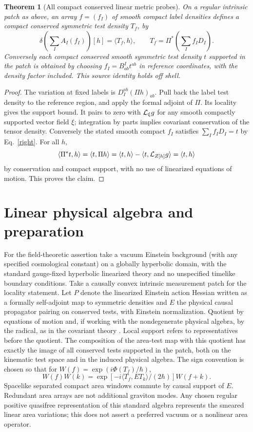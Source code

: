 \documentclass[11pt]{article}
\newtheorem{theorem}{Theorem}\newtheorem{proposition}[theorem]{Proposition}
\begin{document}
\begin{theorem}[All compact conserved linear metric probes]\label{Tlin}
On a regular intrinsic patch as above, an array \(f=(f_I)\) of smooth compact label densities defines a compact conserved symmetric test density \(T_f\), by
\[
 \delta\!\left(\sum_I A_I(f_I)\right)[h]=\langle T_f,h\rangle,\qquad
 T_f=\Pi^*\!\left(\sum_I f_I D_I\right).
\]
Conversely each compact conserved smooth symmetric test density \(t\) supported in the patch is obtained by choosing \(f_I=B^I_{ab}t^{ab}\) in reference coordinates, with the density factor included. This source identity holds off shell.
\end{theorem}
\begin{proof}
The variation at fixed labels is \(D_I^{ab}(\Pi h)_{ab}\). Pull back the label test density to the reference region, and apply the formal adjoint of \(\Pi\). Its locality gives the support bound. It pairs to zero with \(\mathcal L_\xi g\) for any smooth compactly supported vector field \(\xi\); integration by parts implies covariant conservation of the tensor density. Conversely the stated smooth compact \(f_I\) satisfies \(\sum_I f_ID_I=t\) by Eq.~\eqref{right}. For all \(h\),
\[
 \langle \Pi^*t,h\rangle=\langle t,\Pi h\rangle
                        =\langle t,h\rangle-\langle t,\mathcal L_{Z[h]}g\rangle
                        =\langle t,h\rangle
\]
by conservation and compact support, with no use of linearized equations of motion. This proves the claim.
\end{proof}

\section{Linear physical algebra and preparation}
For the field-theoretic assertion take a vacuum Einstein background (with any specified cosmological constant) on a globally hyperbolic domain, with the standard gauge-fixed hyperbolic linearized theory and no unspecified timelike boundary conditions. Take a causally convex intrinsic measurement patch for the locality statement. Let \(P\) denote the linearized Einstein action Hessian written as a formally self-adjoint map to symmetric densities and \(E\) the physical causal propagator pairing on conserved tests, with Einstein normalization. Quotient by equations of motion and, if working with the nondegenerate physical algebra, by the radical, as in the covariant theory \cite{FH}. Local support refers to representatives before the quotient. The composition of the area-test map with this quotient has exactly the image of all conserved tests supported in the patch, both on the kinematic test space and in the induced physical algebra. The sign convention is chosen so that for \(W(f)=\exp(i\Phi(T_f)/\hbar)\),
\[
 W(f)W(k)=\exp[-i\langle T_f,ET_k\rangle/(2\hbar)]W(f+k).
\]
Spacelike separated compact area windows commute by causal support of \(E\). Redundant area arrays are not additional graviton modes. Any chosen regular positive quasifree representation of this standard algebra represents the smeared linear area variations; this does not assert a preferred vacuum or a nonlinear area operator.
\end{document}
